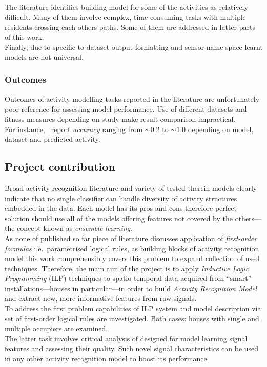 \documentclass[11pt, a4paper, pdflatex, leqno, twoside, openright]{report}
\begin{document}
The literature identifies building model for some of the activities as relatively difficult. Many of them involve complex, time consuming tasks with multiple residents crossing each others paths. Some of them are addressed in latter parts of this work.\\

Finally, due to specific to dataset output formatting and sensor name-space learnt models are not universal.

      \subsubsection{Outcomes}
Outcomes of activity modelling tasks reported in the literature are unfortunately poor reference for assessing model performance. Use of different datasets and fitness measures depending on study make result comparison impractical.\\
For instance,~\citet{fatima2013analysis} report \emph{accuracy} ranging from $\sim0.2$ to $\sim1.0$ depending on model, dataset and predicted activity.


    \subsection{Project contribution}
Broad activity recognition literature and variety of tested therein models clearly indicate that no single classifier can handle diversity of activity structures embedded in the data. Each model has its pros and cons therefore perfect solution should use all of the models offering features not covered by the others---the concept known as \emph{ensemble learning}.\\

As none of published so far piece of literature discusses application of \emph{first-order formulas} i.e.\ parametrised logical rules, as building blocks of activity recognition model this work comprehensibly covers this problem to expand collection of used techniques. Therefore, the main aim of the project is to apply \emph{Inductive Logic Programming} (ILP) techniques to spatio-temporal data acquired from ``smart'' installations---houses in particular---in order to build \emph{Activity Recognition Model} and extract new, more informative features from raw signals.\\

To address the first problem capabilities of ILP system and model description via set of first-order logical rules are investigated. Both cases: houses with single and multiple occupiers are examined.\\
The latter task involves critical analysis of designed for model learning signal features and assessing their quality. Such novel signal characteristics can be used in any other activity recognition model to boost its performance.\\
\end{document}
